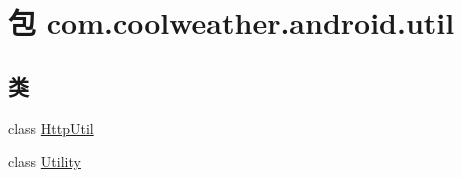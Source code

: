 \hypertarget{namespacecom_1_1coolweather_1_1android_1_1util}{}\section{包 com.\+coolweather.\+android.\+util}
\label{namespacecom_1_1coolweather_1_1android_1_1util}
\subsection*{类}
\begin{DoxyCompactItemize}
\item 
class \mbox{\hyperlink{classcom_1_1coolweather_1_1android_1_1util_1_1_http_util}{Http\+Util}}
\item 
class \mbox{\hyperlink{classcom_1_1coolweather_1_1android_1_1util_1_1_utility}{Utility}}
\end{DoxyCompactItemize}
